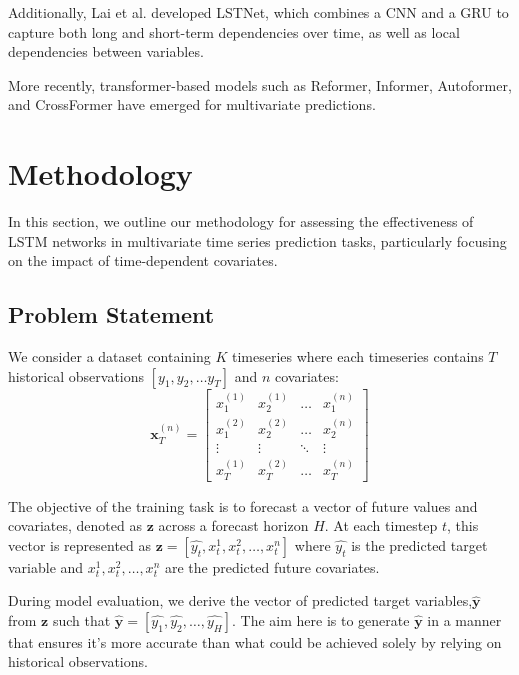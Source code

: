\documentclass{article}
\newcommand{\horizon}{H}
\newcommand{\timeserieslength}{T}
\newcommand{\datasettscount}{K}
\newcommand{\prediction}{\mathbf{z}}
\begin{document}
Additionally, Lai et al. \cite{lai2018modeling} developed LSTNet, which combines a CNN and a GRU to capture both 
long and short-term dependencies over time, as well as local dependencies between variables.

More recently, transformer-based models such as Reformer, Informer, Autoformer, and CrossFormer
\cite{kitaev2020reformer,zhou2021informer,wu2022autoformer, zhang2023crossformer} have emerged for multivariate predictions.



\section{Methodology}
In this section, we outline our methodology for assessing the effectiveness of LSTM networks in 
multivariate time series prediction tasks, particularly focusing on the impact of time-dependent covariates.

\subsection{Problem Statement}
We consider a dataset containing $\datasettscount$ timeseries where each timeseries contains $\timeserieslength$ historical observations $[y_1, y_2, \dots y_T]$
and $n$ covariates: 
\[
\mathbf{x}^{(n)}_{T} = \begin{bmatrix}
x_1^{(1)} & x_2^{(1)} & \ldots & x_1^{(n)} \\
x_1^{(2)} & x_2^{(2)} & \ldots & x_2^{(n)} \\
\vdots & \vdots & \ddots & \vdots \\
x_T^{(1)} & x_T^{(2)} & \ldots & x_T^{(n)}
\end{bmatrix}
\]

The objective of the training task is to forecast a vector of future values and covariates, denoted as  $\prediction$ across a forecast horizon $\horizon$. 
At each timestep $t$, this vector is represented as $\prediction = [\hat{y_t}, x_t^1, x_t^2, \dots, x_t^n]$ where $\hat{y_t}$ is the predicted target variable
and $x_t^1, x_t^2, \dots, x_t^n$ are the predicted future covariates. 

During model evaluation, we derive the vector of predicted target variables,$\mathbf{\hat{y}}$ from $\prediction$ such that $\mathbf{\hat{y}} = [\hat{y_1}, \hat{y_2}, \dots, \hat{y_\horizon}]$.
The aim here is to generate $\mathbf{\hat{y}}$ in a manner that ensures it's more accurate than what could be achieved solely by relying on historical observations.
\end{document}
